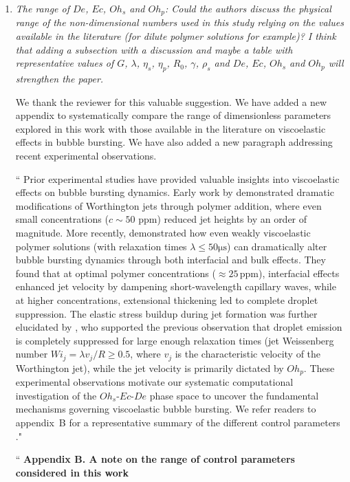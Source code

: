 \documentclass[]{article}
\newcommand{\oo}{\color{magenta} \normalfont}
\newcommand{\bb}{\color{black} \normalfont}
\begin{document}
\begin{enumerate}
\item \textit{The range of $De$, $Ec$, $Oh_s$ and $Oh_p$: Could the authors discuss the physical range of the
non-dimensional numbers used in this study relying on the values available in the
literature (for dilute polymer solutions for example)? I think that adding a subsection
with a discussion and maybe a table with representative values of $G$, $\lambda$, $\eta_s$, $\eta_p$, $R_0$, $\gamma$, $\rho_s$ and $De$, $Ec$, $Oh_s$ and $Oh_p$ will strengthen the paper.}

We thank the reviewer for this valuable suggestion. We have added a new appendix to systematically compare the range of dimensionless parameters explored in this work with those available in the literature on viscoelastic effects in bubble bursting. We have also added a new paragraph addressing recent experimental observations.

``\oo Prior experimental studies have provided valuable insights into viscoelastic effects on bubble bursting dynamics. Early work by \citet{cheny1996extravagant} demonstrated dramatic modifications of Worthington jets through polymer addition, where even small concentrations ($c \sim 50$ ppm) reduced jet heights by an order of magnitude.
More recently, \citet{rodriguez2023bubble} demonstrated how even weakly viscoelastic polymer solutions (with relaxation times $\lambda \leq 50\si{\micro\second}$) can dramatically alter bubble bursting dynamics through both interfacial and bulk effects. They found that at optimal polymer concentrations ($\approx 25\,\text{ppm}$), interfacial effects enhanced jet velocity by dampening short-wavelength capillary waves, while at higher concentrations, extensional thickening led to complete droplet suppression.
The elastic stress buildup during jet formation was further elucidated by \citet{cabalganteeffect}, who supported the previous observation that droplet emission is completely suppressed for large enough relaxation times (jet Weissenberg number $Wi_j = \lambda v_j/R \ge 0.5$, where $v_j$ is the characteristic velocity of the Worthington jet), while the jet velocity is primarily dictated by $Oh_p$. These experimental observations motivate our systematic computational investigation of the $Oh_s$-$Ec$-$De$ phase space to uncover the fundamental mechanisms governing viscoelastic bubble bursting.  We refer readers to appendix~B for a representative summary of the different control parameters\bb."

``\oo
\textbf{Appendix B. A note on the range of control parameters considered in this work}


\end{enumerate}
\end{document}
